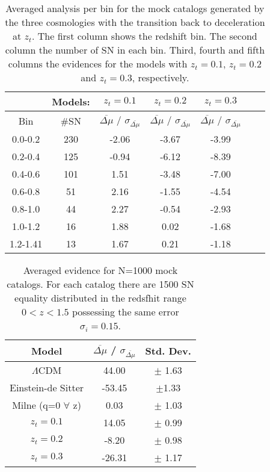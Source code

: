 \documentclass[nofootinbib,twocolumn]{revtex4}
\begin{document}
\begin{table}
\centering
\caption{Averaged analysis per bin for the mock catalogs generated by the three cosmologies with the transition back to deceleration at $z_t$. The first column shows the redshift bin. The second column the number of SN in each bin. Third, fourth and fifth columns the evidences for the models with 
 $z_t=0.1$, $z_t=0.2$ and $z_t=0.3$, respectively.}
\label{my-label}
\begin{tabular}{ccccccc}
\hline
&Models: & $z_t=0.1$ &$z_t=0.2$ & $z_t=0.3$ \\ \hline
Bin     & \#SN       &   $\overline{\Delta \mu}$ / $\sigma_{\overline{\Delta\mu}}$    & $\overline{\Delta \mu}$ / $\sigma_{\overline{\Delta\mu}}$  & $\overline{\Delta \mu}$ / $\sigma_{\overline{\Delta\mu}}$     \\ \hline \hline
  0.0-0.2  &     230    &  -2.06 &  -3.67 &    -3.99   \\
  0.2-0.4  &      125     &    -0.94     &  -6.12       &    -8.39    \\
  0.4-0.6   &       101    &      1.51 &    -3.48      &    -7.00      \\
  0.6-0.8   &    51      &   2.16    &    -1.55    &  -4.54        \\
  0.8-1.0   &      44     &       2.27   &      -0.54     &     -2.93    \\
  1.0-1.2   &     16     &      1.88   &    0.02      &   -1.68      \\
  1.2-1.41   &     13      &      1.67   &    0.21       &   -1.18     \\ \hline
\end{tabular}
\label{taBinMOck}
\end{table}


\begin{table}
\centering
\caption{Averaged evidence for N=1000 mock catalogs. For each catalog there are 1500 SN equality distributed in the redsfhit range $0<z<1.5$ possessing the same error $\sigma_i=0.15$. }
{\begin{tabular} {c||c||c}
Model & $\overline{\Delta \mu}$ / $\sigma_{\overline{\Delta\mu}}$   & Std. Dev. \\
\hline \hline 
$\Lambda$CDM & 44.00 & $\pm$ 1.63 \\
Einstein-de Sitter& -53.45 & $\pm$1.33\\
Milne (q=0 $\forall$ z) & 0.03 & $\pm$ 1.03  \\
$z_t=0.1$ & 14.05 & $\pm$ 0.99  \\
$z_t=0.2$ & -8.20 & $\pm$ 0.98  \\
$z_t=0.3$ &  -26.31& $\pm$ 1.17  \\
\hline
\end{tabular}}
\label{ta1500}
\end{table}
\end{document}
